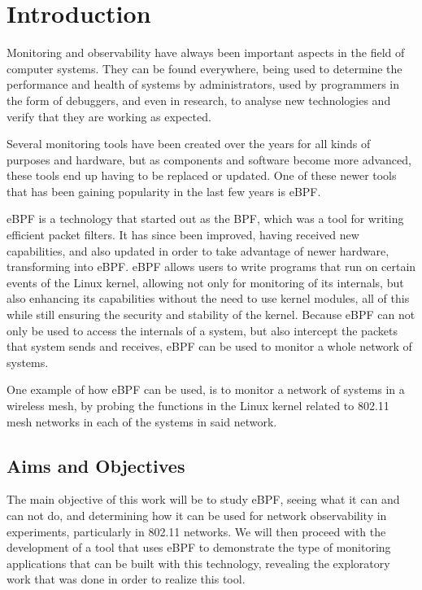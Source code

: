 \chapter{Introduction}\label{chap:intro}

Monitoring and observability have always been important aspects in the field of
computer systems. They can be found everywhere, being used to determine the
performance and health of systems by administrators, used by programmers in the
form of debuggers, and even in research, to analyse new technologies and verify
that they are working as expected.

Several monitoring tools have been created over the years for all kinds of
purposes and hardware, but as components and software become more advanced,
these tools end up having to be replaced or updated. One of these newer tools
that has been gaining popularity in the last few years is eBPF.

eBPF is a technology that started out as the \ac{BPF}, which was a tool for
writing efficient packet filters. It has since been improved, having received
new capabilities, and also updated in order to take advantage of newer hardware,
transforming into eBPF. eBPF allows users to write programs that run on certain
events of the Linux kernel, allowing not only for monitoring of its internals,
but also enhancing its capabilities without the need to use kernel modules, all
of this while still ensuring the security and stability of the kernel. Because
eBPF can not only be used to access the internals of a system, but also
intercept the packets that system sends and receives, eBPF can be used to
monitor a whole network of systems.

One example of how eBPF can be used, is to monitor a network of systems in a
wireless mesh, by probing the functions in the Linux kernel related to 802.11
mesh networks in each of the systems in said network.

\section{Aims and Objectives}

The main objective of this work will be to study eBPF, seeing what it can and
can not do, and determining how it can be used for network observability in
experiments, particularly in 802.11 networks. We will then proceed with the
development of a tool that uses eBPF to demonstrate the type of monitoring
applications that can be built with this technology, revealing the exploratory
work that was done in order to realize this tool.

